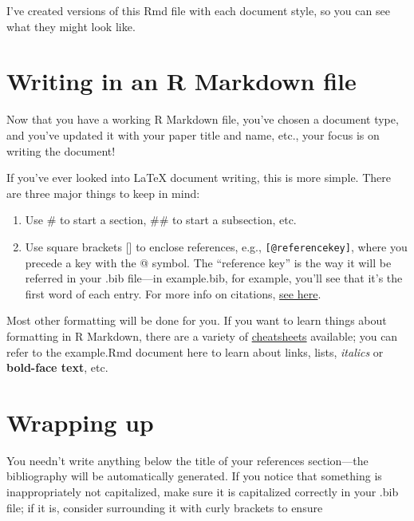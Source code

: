 \documentclass[jou]{apa7}
\providecommand{\tightlist}{%
  \setlength{\itemsep}{0pt}\setlength{\parskip}{0pt}}
\begin{document}
I've created versions of this Rmd file with each document style, so you
can see what they might look like.

\hypertarget{writing-in-an-r-markdown-file}{%
\section{Writing in an R Markdown
file}\label{writing-in-an-r-markdown-file}}

Now that you have a working R Markdown file, you've chosen a document
type, and you've updated it with your paper title and name, etc., your
focus is on writing the document!

If you've ever looked into LaTeX document writing, this is more simple.
There are three major things to keep in mind:

\begin{enumerate}
\def\labelenumi{\arabic{enumi}.}
\tightlist
\item
  Use \# to start a section, \#\# to start a subsection, etc.
\item
  Use square brackets {[}{]} to enclose references, e.g.,
  \texttt{{[}@referencekey{]}}, where you precede a key with the @
  symbol. The ``reference key'' is the way it will be referred in your
  .bib file---in example.bib, for example, you'll see that it's the
  first word of each entry. For more info on citations,
  \href{https://rmarkdown.rstudio.com/authoring_bibliographies_and_citations.html\#citations}{see
  here}.
\end{enumerate}

Most other formatting will be done for you. If you want to learn things
about formatting in R Markdown, there are a variety of
\href{https://rmarkdown.rstudio.com/lesson-15.html}{cheatsheets}
available; you can refer to the example.Rmd document here to learn about
links, lists, \emph{italics} or \textbf{bold-face text}, etc.

\hypertarget{wrapping-up}{%
\section{Wrapping up}\label{wrapping-up}}

You needn't write anything below the title of your references
section---the bibliography will be automatically generated. If you
notice that something is inappropriately not capitalized, make sure it
is capitalized correctly in your .bib file; if it is, consider
surrounding it with curly brackets to ensure
\end{document}
